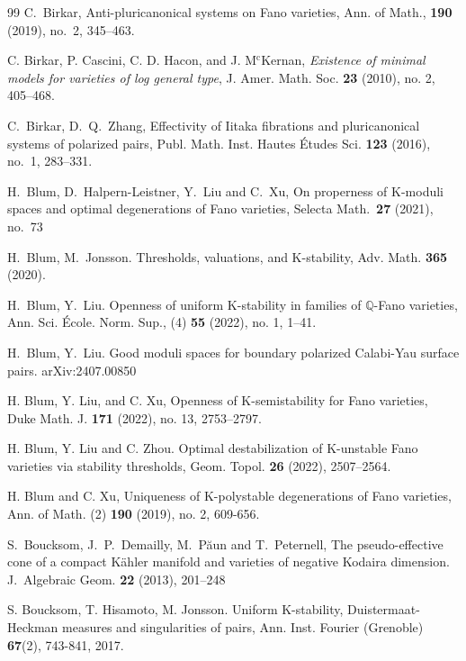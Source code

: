 \documentclass[12pt,twoside]{amsart}
\theoremstyle{definition}
\begin{document}
\begin{thebibliography}{99}
 C.~Birkar, Anti-pluricanonical systems on Fano varieties, Ann. of Math., {\textbf{190}} (2019), no.~2, 345--463. 



 C. Birkar, P. Cascini, C. D. Hacon, and J. M$^\mathrm{c}$Kernan, {\it Existence of minimal models for varieties of log general type}, J. Amer. Math. Soc. {\bf23} (2010), no. 2, 405--468.


 C.~Birkar, D.~Q.~Zhang, Effectivity of Iitaka fibrations and pluricanonical systems of polarized pairs, Publ. Math. Inst. Hautes \'Etudes Sci. {\textbf{123}} (2016), no.~1, 283--331.



 H.~Blum, D.~Halpern-Leistner, Y.~Liu and C.~Xu, On properness of K-moduli spaces and optimal degenerations of Fano varieties, Selecta Math.~{\bf 27} (2021), no.~73

 H.~Blum, M.~Jonsson. Thresholds, valuations, and K-stability, Adv. Math. {\bf365} (2020).



 H.~Blum, Y.~Liu. Openness of uniform K-stability in families of $\mathbb{Q}$-Fano varieties, Ann. Sci. \'{E}cole. Norm. Sup., (4) {\bf55} (2022), no. 1, 1--41.

 H.~Blum, Y.~Liu. Good moduli spaces for boundary polarized Calabi-Yau surface pairs. arXiv:2407.00850



 H. Blum, Y. Liu, and C. Xu, Openness of K-semistability for Fano varieties, Duke Math. J. {\bf171} (2022), no. 13, 2753--2797.

 H. Blum, Y. Liu and C. Zhou. Optimal destabilization of K-unstable Fano varieties via stability thresholds, Geom. Topol. {\bf26} (2022), 2507–2564.

 H. Blum and C. Xu, Uniqueness of K-polystable degenerations of Fano varieties, Ann. of Math. (2) {\bf190} (2019), no. 2, 609-656.



  S.~Boucksom, J.~P.~Demailly, M.~P\u{a}un and T.~Peternell, The pseudo-effective cone of a compact Kähler manifold and varieties of negative Kodaira dimension. J.~Algebraic Geom. {\bf22} (2013), 201--248 


 S. Boucksom, T. Hisamoto, M. Jonsson. Uniform K-stability, Duistermaat-Heckman measures and singularities of pairs, Ann. Inst. Fourier (Grenoble) {\bf 67}(2), 743-841, 2017.





\end{thebibliography}
\end{document}
